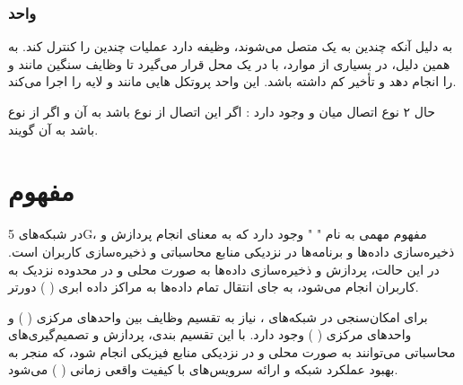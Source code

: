 \documentclass[landscape, 12pt]{report}
\begin{document}
\subsubsection*{واحد 
	}
به دلیل آنکه چندین
  به یک
    متصل می‌شوند،
      وظیفه دارد عملیات چندین
        را کنترل ‌کند. به همین دلیل، در بسیاری از موارد،
          با
            در یک محل قرار می‌گیرد تا وظایف سنگین مانند
              و
                را انجام دهد و تأخیر کم داشته باشد. این واحد پروتکل هایی مانند
                  و لایه
                    را اجرا می‌کند.
                    
حال ۲ نوع اتصال میان
  و
    وجود دارد :
اگر این اتصال از نوع
  باشد به آن
    و اگر از نوع
      باشد به آن
        گویند.
        
 \section*{مفهوم 
 	}
در شبکه‌های 5G، مفهوم مهمی به نام "
" وجود دارد که به معنای انجام پردازش و ذخیره‌سازی داده‌ها و برنامه‌ها در نزدیکی منابع محاسباتی و ذخیره‌سازی کاربران است. در این حالت، پردازش و ذخیره‌سازی داده‌ها به صورت محلی و در محدوده نزدیک به کاربران انجام می‌شود، به جای انتقال تمام داده‌ها به مراکز داده ابری ( 
) دورتر.

برای امکان‌سنجی
  در شبکه‌های
   ، نیاز به تقسیم وظایف بین واحدهای مرکزی (
   ) و واحدهای مرکزی (
	 ) وجود دارد. با این تقسیم بندی، پردازش و تصمیم‌گیری‌های محاسباتی می‌توانند به صورت محلی و در نزدیکی منابع فیزیکی انجام شود، که منجر به بهبود عملکرد شبکه و ارائه سرویس‌های با کیفیت واقعی زمانی (
	 ) می‌شود.
	 
\end{document}
